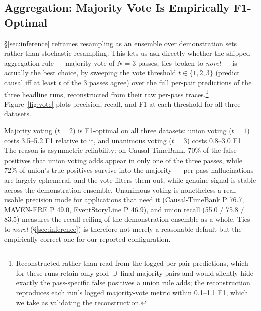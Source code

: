 \documentclass[11pt]{article}
\begin{document}
\subsection{Aggregation: Majority Vote Is Empirically F1-Optimal}
\label{sec:voting}

\S\ref{sec:inference} reframes resampling as an ensemble over demonstration sets
rather than stochastic resampling. This lets us ask directly whether the shipped
aggregation rule --- majority vote of $N=3$ passes, ties broken to \textit{norel}
--- is actually the best choice, by sweeping the vote threshold $t \in \{1,2,3\}$
(predict causal iff at least $t$ of the 3 passes agree) over the full per-pair
predictions of the three headline runs, reconstructed from their raw per-pass
traces.\footnote{Reconstructed rather than read from the logged per-pair
predictions, which for these runs retain only gold~$\cup$~final-majority pairs and
would silently hide exactly the pass-specific false positives a union rule adds;
the reconstruction reproduces each run's logged majority-vote metric within
0.1--1.1 F1, which we take as validating the reconstruction.} Figure~\ref{fig:vote}
plots precision, recall, and F1 at each threshold for all three datasets.

Majority voting ($t=2$) is F1-optimal on all three datasets: union voting ($t=1$)
costs 3.5--5.2 F1 relative to it, and unanimous voting ($t=3$) costs 0.8--3.0 F1.
The reason is asymmetric reliability: on Causal-TimeBank, 70\% of the false
positives that union voting adds appear in only one of the three passes, while
72\% of union's true positives survive into the majority --- per-pass
hallucinations are largely ephemeral, and the vote filters them out, while genuine
signal is stable across the demonstration ensemble. Unanimous voting is
nonetheless a real, usable precision mode for applications that need it
(Causal-TimeBank P 76.7, MAVEN-ERE P 49.0, EventStoryLine P 46.9), and union
recall (55.0 / 75.8 / 83.5) measures the recall ceiling of the demonstration
ensemble as a whole. Ties-to-\textit{norel} (\S\ref{sec:inference}) is therefore
not merely a reasonable default but the empirically correct one for our reported
configuration.
\end{document}
